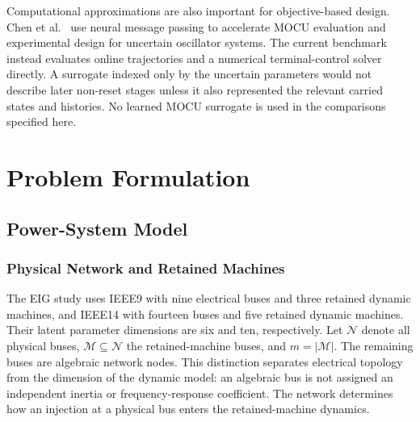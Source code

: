 \documentclass[journal]{IEEEtran}
\begin{document}
Computational approximations are also important for objective-based design.
Chen et al.~\cite{chen2023objectiveoed} use neural message passing to accelerate
MOCU evaluation and experimental design for uncertain oscillator systems.
The current benchmark instead evaluates online trajectories and a numerical
terminal-control solver directly. A surrogate indexed only by the uncertain
parameters would not describe later non-reset stages unless it also represented
the relevant carried states and histories. No learned MOCU surrogate is used
in the comparisons specified here.

\section{Problem Formulation}
\label{sec:formulation}
\subsection{Power-System Model}
\label{sec:system-model}
\label{sec:ieee-system}
\subsubsection{Physical Network and Retained Machines}
The EIG study uses IEEE9 with nine electrical buses and three retained
dynamic machines, and IEEE14 with fourteen buses and five retained dynamic
machines. Their latent parameter dimensions are six and ten, respectively. Let $\mathcal N$ denote all physical
buses, $\mathcal M\subseteq\mathcal N$ the retained-machine buses, and
$m=|\mathcal M|$. The remaining buses are algebraic network nodes.
This distinction separates electrical topology from the dimension of the
dynamic model: an algebraic bus is not assigned an independent inertia or
frequency-response coefficient. The network determines how an injection at
a physical bus enters the retained-machine dynamics.
\end{document}
